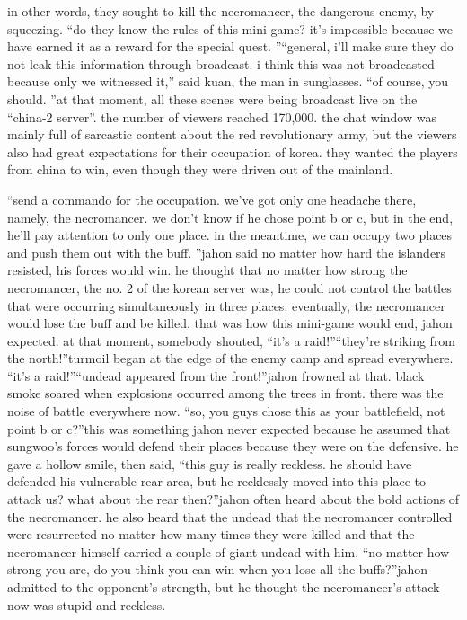  in other words, they sought to kill the necromancer, the dangerous enemy, by squeezing.
“do they know the rules of this mini-game? it’s impossible because we have earned it as a reward for the special quest.
”“general, i’ll make sure they do not leak this information through broadcast.
 i think this was not broadcasted because only we witnessed it,” said kuan, the man in sunglasses.
“of course, you should.
”at that moment, all these scenes were being broadcast live on the “china-2 server”.
 the number of viewers reached 170,000.
 the chat window was mainly full of sarcastic content about the red revolutionary army, but the viewers also had great expectations for their occupation of korea.
 they wanted the players from china to win, even though they were driven out of the mainland.

“send a commando for the occupation.
 we’ve got only one headache there, namely, the necromancer.
 we don’t know if he chose point b or c, but in the end, he’ll pay attention to only one place.
 in the meantime, we can occupy two places and push them out with the buff.
”jahon said no matter how hard the islanders resisted, his forces would win.
he thought that no matter how strong the necromancer, the no.
 2 of the korean server was, he could not control the battles that were occurring simultaneously in three places.
eventually, the necromancer would lose the buff and be killed.
 that was how this mini-game would end, jahon expected.
at that moment, somebody shouted, “it’s a raid!”“they’re striking from the north!”turmoil began at the edge of the enemy camp and spread everywhere.
“it’s a raid!”“undead appeared from the front!”jahon frowned at that.
 black smoke soared when explosions occurred among the trees in front.
 there was the noise of battle everywhere now.
“so, you guys chose this as your battlefield, not point b or c?”this was something jahon never expected because he assumed that sungwoo’s forces would defend their places because they were on the defensive.
he gave a hollow smile, then said, “this guy is really reckless.
 he should have defended his vulnerable rear area, but he recklessly moved into this place to attack us? what about the rear then?”jahon often heard about the bold actions of the necromancer.
 he also heard that the undead that the necromancer controlled were resurrected no matter how many times they were killed and that the necromancer himself carried a couple of giant undead with him.
“no matter how strong you are, do you think you can win when you lose all the buffs?”jahon admitted to the opponent’s strength, but he thought the necromancer’s attack now was stupid and reckless.
